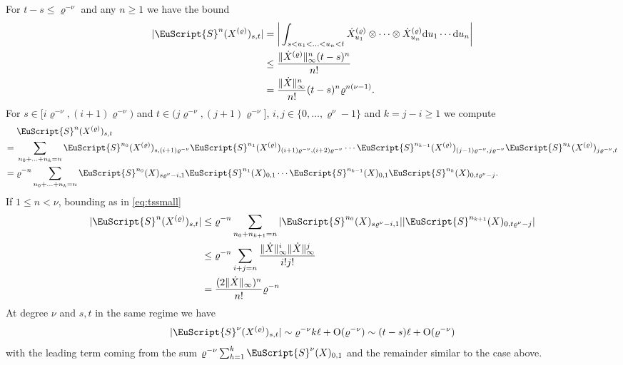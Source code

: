 \documentclass{article}
\def\d{\mathrm{d}}
\def\Sig{\EuScript{S}}
\numberwithin{equation}{section}
\theoremstyle{definition}
\theoremstyle{remark}
\begin{document}
For $t-s \leq \varrho^{-\nu}$ and any $n \geq 1$ we have the bound
\begin{equation}\label{eq:tssmall}
\begin{split}
|\Sig^n(X^{(\varrho)})_{s,t}| &= \bigg| \int_{s < u_1 < \ldots < u_n < t} \dot X_{u_1}^{(\varrho)} \otimes \cdots \otimes \dot X_{u_n}^{(\varrho)} \d u_1 \cdots \d u_n \bigg| \\
&\leq \frac{\lVert \dot X^{(\varrho)} \rVert_{\infty}^n(t-s)^n}{n!} \\
&= \frac {\lVert \dot X \rVert_{\infty}^n}{n!} (t-s)^n \varrho^{n(\nu - 1)}.
\end{split}
\end{equation}
For $s \in [i\varrho^{-\nu}, (i+1)\varrho^{-\nu})$ and $t \in (j\varrho^{-\nu}, (j+1)\varrho^{-\nu}]$, $i,j \in \{0,\ldots,\varrho^\nu - 1\}$ and $k = j - i \geq 1$ we compute
\begin{align*}
&\Sig^n(X^{(\varrho)})_{s,t} \\
={} &\sum_{n_0 + \ldots + n_k = n} \Sig^{n_0}(X^{(\varrho)})_{s,(i+1)\varrho^{-\nu}} \Sig^{n_1}(X^{(\varrho)})_{(i+1)\varrho^{-\nu}, (i+2)\varrho^{-\nu}} \cdots \Sig^{n_{k-1}}(X^{(\varrho)})_{(j-1)\varrho^{-\nu}, j\varrho^{-\nu}} \Sig^{n_k}(X^{(\varrho)})_{j\varrho^{-\nu}, t} \\
={} &\varrho^{-n} \sum_{n_0 + \ldots + n_k = n} \Sig^{n_0}(X)_{s\varrho^\nu - i,1} \Sig^{n_1}(X)_{0,1} \cdots \Sig^{n_{k-1}}(X)_{0,1} \Sig^{n_k}(X)_{0, t\varrho^\nu - j} .
\end{align*}
If $1 \leq n < \nu$, bounding as in \eqref{eq:tssmall}
\begin{equation}\label{eq:nlessnu}
\begin{split}
|\Sig^n(X^{(\varrho)})_{s,t}| &\leq \varrho^{-n} \sum_{n_0 + n_{k+1} = n} |\Sig^{n_0}(X)_{s\varrho^\nu - i,1}| |\Sig^{n_{k+1}}(X)_{0, t\varrho^\nu - j}| \\
&\leq \varrho^{-n} \sum_{i+j = n} \frac{\|\dot X\|_\infty^i \|\dot X\|_\infty^j}{i!j!}\\
&= \frac{(2\|\dot X\|_\infty)^n}{n!} \varrho^{-n}
\end{split}
\end{equation}
At degree $\nu$ and $s,t$ in the same regime we have
\begin{equation}\label{eq:atnu}
|\Sig^\nu(X^{(\varrho)})_{s,t}| \sim \varrho^{-\nu}k \ell + \mathrm{O}(\varrho^{-\nu}) \sim (t-s)\ell + \mathrm{O}(\varrho^{-\nu})
\end{equation}
with the leading term coming from the sum $\varrho^{-\nu}\sum_{h  = 1}^k \Sig^\nu(X)_{0,1}$ and the remainder similar to the case above.
\end{document}
